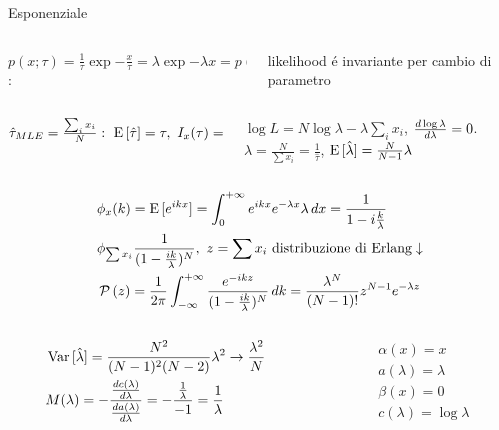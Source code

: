 \documentclass[asd-beamer.tex]{subfiles}%
\begin{document}
\begin{frame}{Esponenziale}    
\begin{columns}[T]
\begin{column}{0.6\textwidth}
 $p(x;\tau)=\frac{1}{\tau}\exp{-\frac{x}{\tau}}=\lambda\exp{-\lambda x}=p(x;\lambda)$:
\end{column}
\begin{column}{0.4\textwidth}
likelihood \'e invariante per cambio di parametro
\end{column}
\end{columns}
\begin{columns}[b]
\begin{column}{0.4\textwidth}
$\hat{\tau}_{MLE}=\frac{\sum_ix_i}{N}:\ \E{[\hat{\tau}]}=\tau,\ I_x(\tau)=\frac{1}{\var{\hat{\tau}}},\ \var{\hat{\tau}}=\frac{\tau^2}{N}$
\end{column}
\begin{column}{0.6\textwidth}
$\log{L}=N\log{\lambda}-\lambda\sum_ix_i$, $\frac{d \log{\lambda}}{d \lambda}=0$. $\hat{\lambda}=\frac{N}{\sum x_i}=\frac{1}{\hat{\tau}}$, $\operatorname{E}{[\hat{\lambda}]}=\frac{N}{N-1}\lambda$
\end{column}
\end{columns}
\begin{align*}
&\phi_x(k)=\E{[\exp{ikx}]}=\intzi\exp{ikx}\exp{-\lambda x}\lambda\,dx=\frac{1}{1-i\frac{k}{\lambda}}\\
&\phi_{\sum x_i}\frac{1}{(1-\frac{ik}{\lambda})^N},\ z=\sum x_i\ \text{distribuzione di Erlang}\downarrow\\
&\prob{(z)}=\frac{1}{2\pi}\intsinf{}\frac{\exp{-ikz}}{(1-\frac{ik}{\lambda})^N}\,dk=\frac{\lambda^N}{(N-1)!}z^{N-1}\exp{-\lambda z}
\end{align*}
\begin{columns}[T]
\begin{column}{0.65\textwidth}
\begin{align*}
&\operatorname{Var}{[\hat{\lambda}]}=\frac{N^2}{(N-1)^2(N-2)}\lambda^2\to\frac{\lambda^2}{N}\\
&M(\lambda)=-\frac{\frac{d c(\lambda)}{d \lambda}}{\frac{d a(\lambda)}{d \lambda}}=-\frac{\frac{1}{\lambda}}{-1}=\frac{1}{\lambda}
\end{align*}
\end{column}
\begin{column}{0.35\textwidth}
\begin{align*}
&\alpha(x)=x\\
&a(\lambda)=\lambda\\
&\beta(x)=0\\
&c(\lambda)=\log{\lambda}
\end{align*}
\end{column}
\end{columns}
\end{frame}
\end{document}
